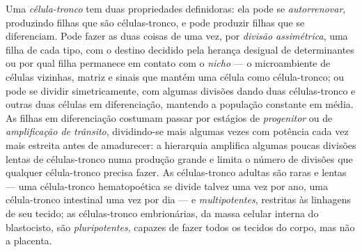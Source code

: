 \begin{definition}\label{def:b3:stem-cells:stem}
Uma \emph{célula-tronco} tem duas propriedades definidoras: ela pode se
\emph{autorrenovar}, produzindo filhas que são células-tronco, e pode
produzir filhas que se diferenciam. Pode fazer as duas coisas de uma vez,
por \emph{divisão assimétrica}, uma filha de cada tipo, com o destino
decidido pela herança desigual de determinantes ou por qual filha
permanece em contato com o \emph{nicho} --- o microambiente de células
vizinhas, matriz e sinais que mantém uma célula como célula-tronco; ou
pode se dividir simetricamente, com algumas divisões dando duas
células-tronco e outras duas células em diferenciação, mantendo a
população constante em média. As filhas em diferenciação costumam passar
por estágios de \emph{progenitor} ou de \emph{amplificação de trânsito},
dividindo-se mais algumas vezes com potência cada vez mais estreita antes
de amadurecer: a hierarquia amplifica algumas poucas divisões lentas de
células-tronco numa produção grande e limita o número de divisões que
qualquer célula-tronco precisa fazer. As células-tronco adultas são raras
e lentas --- uma célula-tronco hematopoética se divide talvez uma vez por
ano, uma célula-tronco intestinal uma vez por dia --- e
\emph{multipotentes}, restritas às linhagens de seu tecido; as
células-tronco embrionárias, da massa celular interna do blastocisto, são
\emph{pluripotentes}, capazes de fazer todos os tecidos do corpo, mas não
a placenta.
\end{definition}

